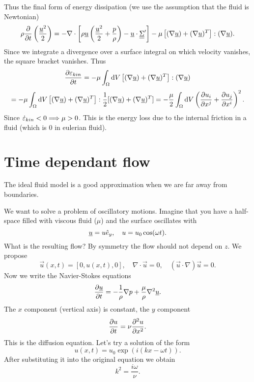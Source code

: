 \documentclass[../main.tex]{subfiles}
\begin{document}
    Thus the final form of energy dissipation (we use the assumption that the fluid is Newtonian)
    \begin{displaymath}
      \rho \frac{\partial }{\partial t} \left( \frac{\underline{u}^2}{2} \right) 
      = - \nabla\cdot \left[ \rho \underline{u} \left( \frac{\underline{u}^2}{2} + \frac{p}{\rho}\right) - \underline{u} \cdot \underline{\underline{{\Sigma}}}'\right] 
      - \mu\left[ (\nabla \underline{u}) + (\nabla \underline{u})^T \right] : (\nabla \underline{u}).
    \end{displaymath}
    Since we integrate a divergence over a surface integral on which velocity vanishes, the square bracket vanishes.
    Thus
    \begin{displaymath}
      \frac{\partial \varepsilon_{kin}}{\partial t} = - \mu \int_\Omega \mathrm{d} V\left[ (\nabla \underline{u}) + (\nabla \underline{u})^T \right] : (\nabla \underline{u})
    \end{displaymath}
    \begin{displaymath}
      = - \mu \int_\Omega \mathrm{d} V\left[ (\nabla \underline{u}) + (\nabla \underline{u})^T \right] : \frac{1}{2}[(\nabla \underline{u}) + (\nabla \underline{u})^T]
      = -\frac{\mu}{2} \int_\Omega \mathrm{d} V \left( \frac{\partial u_i}{\partial x^j} + \frac{\partial u_j}{\partial x^i} \right)^2 .
    \end{displaymath}
    Since $\dot \varepsilon_{kin} < 0 \Longrightarrow \mu > 0$.
    This is the energy loss due to the internal friction in a fluid (which is 0 in eulerian fluid).
    

    \section{Time dependant flow}
    The ideal fluid model is a good approximation when we are far away from boundaries.

    We want to solve a problem of oscillatory motions.
    Imagine that you have a half-space filled with viscous fluid ($\mu$) and the surface oscillates with
    \begin{displaymath}
      \underline{u} = u \hat{e}_y, \quad u = u_0 \cos (\omega t).
    \end{displaymath}
    What is the resulting flow?
    By symmetry the flow should not depend on $z$.
    We propose
    \begin{displaymath}
      \vec u(x, t) = [0, u(x, t), 0], \quad \nabla \cdot \vec u = 0, \quad (\vec u \cdot \nabla) \vec u = 0.
    \end{displaymath}
    Now we write the Navier-Stokes equations
    \begin{displaymath}
      \frac{\partial \underline{u}}{\partial t} = - \frac{1}{\rho} \nabla p + \frac{\mu}{\rho} \nabla^2 \underline{u}.
    \end{displaymath}
    The $x$ component (vertical axis) is constant, the $y$ component
    \begin{displaymath}
      \frac{\partial u}{\partial t} = \nu \frac{\partial^2 u}{\partial x ^ 2}.
    \end{displaymath}
    This is the diffusion equation.
    Let's try a solution of the form
    \begin{displaymath}
      u(x, t) = u_0 \exp(i(k x - \omega t)).
    \end{displaymath}
    After substituting it into the original equation we obtain
    \begin{displaymath}
      k^2 = \frac{i \omega}{\nu}.
    \end{displaymath}
\end{document}
